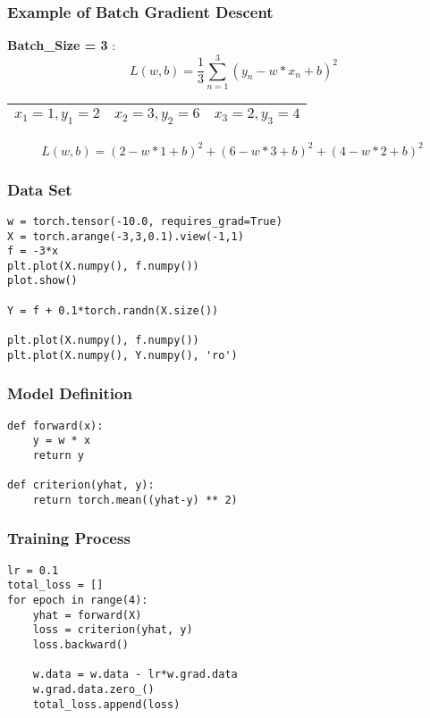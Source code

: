 \documentclass[14 pt]{beamer}
\begin{document}
 \begin{frame}[fragile]
   \frametitle{Example of Batch Gradient Descent}
\textbf{Batch\_Size = 3} : 
  \begin{displaymath}
     \ L(w,b)   =  \frac{1}{3} \sum_{n=1}^{3} (y_n - w*x_n+b)^2 
   \end{displaymath}
   \begin{table}
     \centering
     \begin{tabular}{|l|l|l|}
\hline
       $x_1=1, y_1=2$ & $x_2=3, y_2=6$ & $x_3=2, y_3=4$ \\
\hline
     \end{tabular}
   \end{table}
   \begin{displaymath}
    L(w,b)= (2-w*1+b)^2+(6-w*3+b)^2+(4-w*2+b)^2
   \end{displaymath}
 \end{frame}

\begin{frame}[fragile]
\frametitle{Data Set}
  \begin{block}{}
\begin{verbatim}
w = torch.tensor(-10.0, requires_grad=True)
X = torch.arange(-3,3,0.1).view(-1,1)
f = -3*x
plt.plot(X.numpy(), f.numpy())
plot.show()

Y = f + 0.1*torch.randn(X.size())

plt.plot(X.numpy(), f.numpy())
plt.plot(X.numpy(), Y.numpy(), 'ro')
\end{verbatim}
  \end{block}
\end{frame}

\begin{frame}[fragile]
\frametitle{Model Definition}
  \begin{block}{}
\begin{verbatim}
def forward(x):
    y = w * x
    return y

def criterion(yhat, y):
    return torch.mean((yhat-y) ** 2)
\end{verbatim}
  \end{block}
\end{frame}

\begin{frame}[fragile]
\frametitle{Training Process}
  \begin{block}{}
\begin{verbatim}
lr = 0.1
total_loss = []
for epoch in range(4):
    yhat = forward(X)
    loss = criterion(yhat, y)
    loss.backward()

    w.data = w.data - lr*w.grad.data
    w.grad.data.zero_()
    total_loss.append(loss)
\end{verbatim}
  \end{block}
\end{frame}
\end{document}
